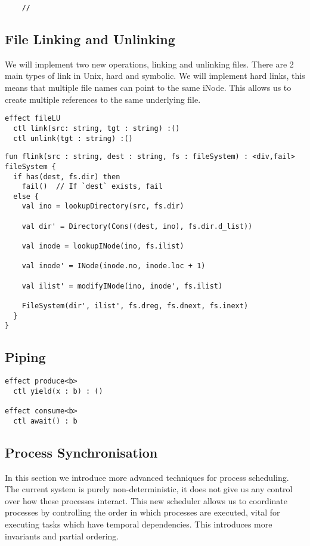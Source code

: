 \documentclass[logo,bsc,singlespacing,parskip]{infthesis}
\begin{document}
\begin{lstlisting}
    //
\end{lstlisting}

\subsection*{File Linking and Unlinking}
We will implement two new operations, linking and unlinking files. There are 2 main types of link in Unix, hard and symbolic. We will implement hard links, this means that multiple file names can point to the same iNode. This allows us to create multiple references to the same underlying file.

\begin{lstlisting}
effect fileLU
  ctl link(src: string, tgt : string) :()
  ctl unlink(tgt : string) :()
\end{lstlisting}


\begin{lstlisting}
fun flink(src : string, dest : string, fs : fileSystem) : <div,fail> fileSystem {
  if has(dest, fs.dir) then
    fail()  // If `dest` exists, fail
  else {
    val ino = lookupDirectory(src, fs.dir)

    val dir' = Directory(Cons((dest, ino), fs.dir.d_list))

    val inode = lookupINode(ino, fs.ilist)

    val inode' = INode(inode.no, inode.loc + 1)

    val ilist' = modifyINode(ino, inode', fs.ilist)

    FileSystem(dir', ilist', fs.dreg, fs.dnext, fs.inext)
  }
}
\end{lstlisting}


\subsection*{Piping}
\begin{lstlisting}
effect produce<b>
  ctl yield(x : b) : ()   

effect consume<b>
  ctl await() : b         

\end{lstlisting}

\subsection*{Process Synchronisation}

In this section we introduce more advanced techniques for process scheduling. The current system is purely non-deterministic, it does not give us any control over how these processes interact. This new scheduler allows us to coordinate processes by controlling the order in which processes are executed, vital for executing tasks which have temporal dependencies. This introduces more invariants and partial ordering.
\end{document}
